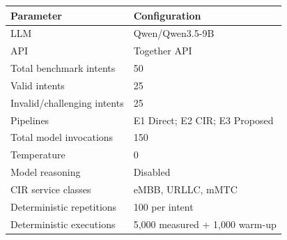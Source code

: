 \begin{tabular}{ll}
\toprule
Parameter & Configuration \\
\midrule
LLM & Qwen/Qwen3.5-9B \\
API & Together API \\
Total benchmark intents & 50 \\
Valid intents & 25 \\
Invalid/challenging intents & 25 \\
Pipelines & E1 Direct; E2 CIR; E3 Proposed \\
Total model invocations & 150 \\
Temperature & 0 \\
Model reasoning & Disabled \\
CIR service classes & eMBB, URLLC, mMTC \\
Deterministic repetitions & 100 per intent \\
Deterministic executions & 5,000 measured + 1,000 warm-up \\
\bottomrule
\end{tabular}
